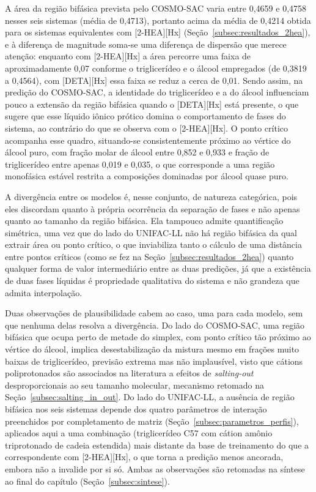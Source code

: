 A área da região bifásica prevista pelo COSMO-SAC varia entre 0,4659 e 0,4758 nesses seis sistemas (média de 0,4713), portanto acima da média de 0,4214 obtida para os sistemas equivalentes com [2-HEA][Hx] (Seção~\ref{subsec:resultados_2hea}), e à diferença de magnitude soma-se uma diferença de dispersão que merece atenção: enquanto com [2-HEA][Hx] a área percorre uma faixa de aproximadamente 0,07 conforme o triglicerídeo e o álcool empregados (de 0,3819 a 0,4564), com [DETA][Hx] essa faixa se reduz a cerca de 0,01. Sendo assim, na predição do COSMO-SAC, a identidade do triglicerídeo e a do álcool influenciam pouco a extensão da região bifásica quando o [DETA][Hx] está presente, o que sugere que esse líquido iônico prótico domina o comportamento de fases do sistema, ao contrário do que se observa com o [2-HEA][Hx]. O ponto crítico acompanha esse quadro, situando-se consistentemente próximo ao vértice do álcool puro, com fração molar de álcool entre 0,852 e 0,933 e fração de triglicerídeo entre apenas 0,019 e 0,035, o que corresponde a uma região monofásica estável restrita a composições dominadas por álcool quase puro.

A divergência entre os modelos é, nesse conjunto, de natureza categórica, pois eles discordam quanto à própria ocorrência da separação de fases e não apenas quanto ao tamanho da região bifásica. Ela tampouco admite quantificação simétrica, uma vez que do lado do UNIFAC-LL não há região bifásica da qual extrair área ou ponto crítico, o que inviabiliza tanto o cálculo de uma distância entre pontos críticos (como se fez na Seção~\ref{subsec:resultados_2hea}) quanto qualquer forma de valor intermediário entre as duas predições, já que a existência de duas fases líquidas é propriedade qualitativa do sistema e não grandeza que admita interpolação.

Duas observações de plausibilidade cabem ao caso, uma para cada modelo, sem que nenhuma delas resolva a divergência. Do lado do COSMO-SAC, uma região bifásica que ocupa perto de metade do simplex, com ponto crítico tão próximo ao vértice do álcool, implica desestabilização da mistura mesmo em frações muito baixas de triglicerídeo, previsão extrema mas não implausível, visto que cátions poliprotonados são associados na literatura a efeitos de \textit{salting-out} desproporcionais ao seu tamanho molecular, mecanismo retomado na Seção~\ref{subsec:salting_in_out}. Do lado do UNIFAC-LL, a ausência de região bifásica nos seis sistemas depende dos quatro parâmetros de interação preenchidos por completamento de matriz (Seção~\ref{subsec:parametros_perfis}), aplicados aqui a uma combinação (triglicerídeo C57 com cátion amônio triprotonado de cadeia estendida) mais distante da base de treinamento do que a correspondente com [2-HEA][Hx], o que torna a predição menos ancorada, embora não a invalide por si só. Ambas as observações são retomadas na síntese ao final do capítulo (Seção~\ref{subsec:sintese}).

